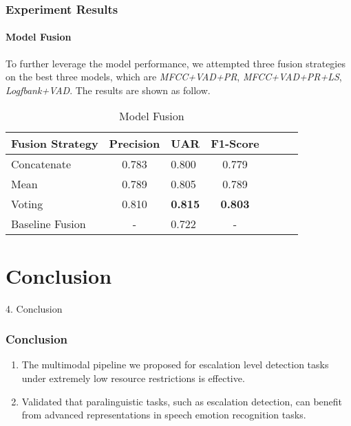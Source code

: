 \documentclass[
	11pt, %
]{beamer}
\begin{document}

\begin{frame}
	\frametitle{Experiment Results}
	\framesubtitle{Model Fusion}
	To further leverage the model performance, we attempted three fusion strategies on the best three models, which are \emph{MFCC+VAD+PR}, \emph{MFCC+VAD+PR+LS}, \emph{Logfbank+VAD}. The results are shown as follow.
    \begin{table}[t]
      \caption{Model Fusion}
      \label{tab:modelfuse}
      \centering
      \begin{tabular}{ lclclcl }
        \toprule
        Fusion Strategy & Precision & UAR    & F1-Score      \\
        \midrule
        Concatenate      & 0.783    & 0.800    & 0.779   \\
        Mean             & 0.789    & 0.805    & 0.789 \\
        Voting      & 0.810   & \textbf{0.815}   & \textbf{0.803} \\
        Baseline Fusion     & -       & 0.722   & - \\
        \bottomrule
      \end{tabular}
    \end{table}
\end{frame}


\section{Conclusion}
\begin{frame}
\begin{center}
    \Huge 4. Conclusion
\end{center}
    
\end{frame}

\begin{frame}
	\frametitle{Conclusion}
	
	\begin{enumerate}
	    \item The multimodal pipeline we proposed for escalation level detection tasks under extremely low resource restrictions is effective.
	    \item Validated that paralinguistic tasks, such as escalation detection, can benefit from advanced representations in speech emotion recognition tasks.
	\end{enumerate}
	
	
	\bigskip %
	
\end{frame}
\end{document}
